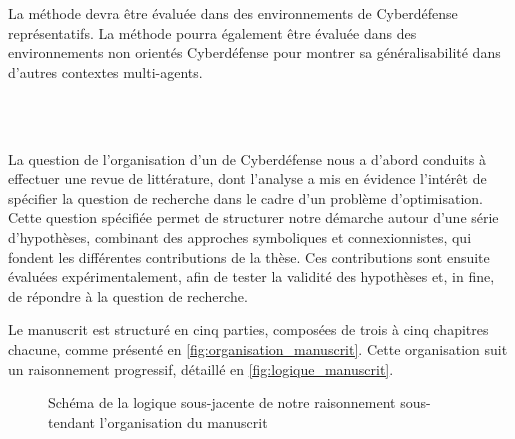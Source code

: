 \noindent La méthode devra être évaluée dans des environnements de Cyberdéfense représentatifs. La méthode pourra également être évaluée dans des environnements non orientés Cyberdéfense pour montrer sa généralisabilité dans d'autres contextes multi-agents.

\

\bigskip

\\

\noindent
La question de l'organisation d'un  de Cyberdéfense nous a d'abord conduits à effectuer une revue de littérature, dont l'analyse a mis en évidence l'intérêt de spécifier la question de recherche dans le cadre d'un problème d'optimisation. Cette question spécifiée permet de structurer notre démarche autour d'une série d'hypothèses, combinant des approches symboliques et connexionnistes, qui fondent les différentes contributions de la thèse. Ces contributions sont ensuite évaluées expérimentalement, afin de tester la validité des hypothèses et, in fine, de répondre à la question de recherche.

\noindent
Le manuscrit est structuré en cinq parties, composées de trois à cinq chapitres chacune, comme présenté en \autoref{fig:organisation_manuscrit}. Cette organisation suit un raisonnement progressif, détaillé en \autoref{fig:logique_manuscrit}.

\begin{figure}[h!]
  \centering
  \resizebox{0.8\textwidth}{!}{%
    
  }
  \caption{Schéma de la logique sous-jacente de notre raisonnement sous-tendant l'organisation du manuscrit}
  \label{fig:logique_manuscrit}
\end{figure}

